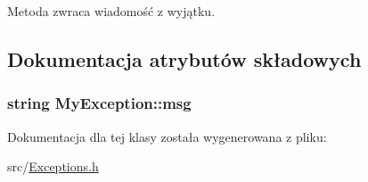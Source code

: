 Metoda zwraca wiadomość z wyjątku. 



\subsection{Dokumentacja atrybutów składowych}
\hypertarget{class_my_exception_ab8a915fca776573643452da65db7d3ed}{
\subsubsection[{msg}]{\setlength{\rightskip}{0pt plus 5cm}string My\-Exception\-::msg\hspace{0.3cm}{\ttfamily [protected]}}}\label{class_my_exception_ab8a915fca776573643452da65db7d3ed}


Dokumentacja dla tej klasy została wygenerowana z pliku\-:\begin{DoxyCompactItemize}
\item 
src/\hyperlink{_exceptions_8h}{Exceptions.\-h}\end{DoxyCompactItemize}
